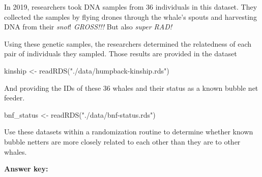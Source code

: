 \documentclass[
]{book}
\newenvironment{Shaded}{\begin{snugshade}}{\end{snugshade}}
\newcommand{\FunctionTok}[1]{\textcolor[rgb]{0.00,0.00,0.00}{#1}}
\newcommand{\NormalTok}[1]{#1}
\newcommand{\OtherTok}[1]{\textcolor[rgb]{0.56,0.35,0.01}{#1}}
\newcommand{\StringTok}[1]{\textcolor[rgb]{0.31,0.60,0.02}{#1}}
\begin{document}
In 2019, researchers took DNA samples from 36 individuals in this dataset. They collected the samples by flying drones through the whale's spouts and harvesting DNA from their \emph{snot}! \emph{GROSS!!!} But also \emph{super RAD!}

Using these genetic samples, the researchers determined the relatedness of each pair of individuals they sampled. Those results are provided in the dataset

\begin{Shaded}
\begin{Highlighting}[]
\NormalTok{kinship }\OtherTok{\textless{}{-}} \FunctionTok{readRDS}\NormalTok{(}\StringTok{"./data/humpback{-}kinship.rds"}\NormalTok{)}
\end{Highlighting}
\end{Shaded}

And providing the IDs of these 36 whales and their status as a known bubble net feeder.

\begin{Shaded}
\begin{Highlighting}[]
\NormalTok{bnf\_status }\OtherTok{\textless{}{-}} \FunctionTok{readRDS}\NormalTok{(}\StringTok{"./data/bnf{-}status.rds"}\NormalTok{)}
\end{Highlighting}
\end{Shaded}

Use these datasets within a randomization routine to determine whether known bubble netters are more closely related to each other than they are to other whales.

\textbf{Answer key:}
\end{document}
